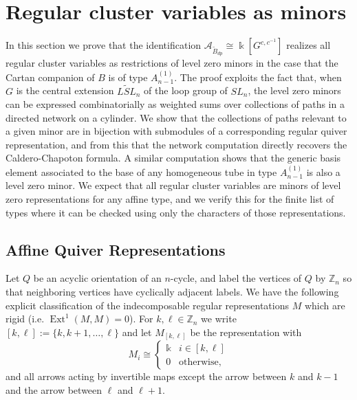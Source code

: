 \documentclass[12pt]{amsart}
\newcommand{\cA}{\mathcal{A}}
\newcommand{\ZZ}{\mathbb{Z}}
\newcommand{\kk}{\Bbbk}
\DeclareMathOperator{\Ext}{Ext}
\newcommand{\Bdp}{\widetilde{B}_{dp}}
\newcommand{\Qrep}{M}
\theoremstyle{remark}
\numberwithin{equation}{section}
\numberwithin{figure}{section}
\begin{document}
\section{Regular cluster variables as minors}

In this section we prove that the identification $\cA_{\Bdp} \cong \kk[G^{c,c^{-1}}]$ realizes all regular cluster variables as restrictions of level zero minors in the case that the Cartan companion of $B$ is of type $A_{n-1}^{\!(1)}$.
The proof exploits the fact that, when $G$ is the central extension $\widetilde{LSL}_n$ of the loop group of $SL_n$, the level zero minors can be expressed combinatorially as weighted sums over collections of paths in a directed network on a cylinder.
We show that the collections of paths relevant to a given minor are in bijection with submodules of a corresponding regular quiver representation, and from this that the network computation directly recovers the Caldero-Chapoton formula.
A similar computation shows that the generic basis element associated to the base of any homogeneous tube in type $A_{n-1}^{\!(1)}$ is also a level zero minor.
We expect that all regular cluster variables are minors of level zero representations for any affine type, and we verify this for the finite list of types where it can be checked using only the characters of those representations.

\subsection{Affine Quiver Representations}\label{sec:rigidregular}
Let $Q$ be an acyclic orientation of an $n$-cycle, and label the vertices of $Q$ by $\ZZ_n$ so that neighboring vertices have cyclically adjacent labels.
We have the following explicit classification of the indecomposable regular representations $\Qrep$ which are rigid (i.e. $\Ext^1(\Qrep,\Qrep)=0$).
For $k,\ell\in\ZZ_n$ we write $[k,\ell]:=\{k,k+1,\ldots,\ell\}$ and let $\Qrep_{[k,\ell]}$ be the representation with 
\[
  \Qrep_i \cong \begin{cases} \kk & i \in [k,\ell] \\ 0 & \text{otherwise,} \end{cases}
\]
and all arrows acting by invertible maps except the arrow between $k$ and $k-1$ and the arrow between $\ell$ and $\ell + 1$.
\end{document}
